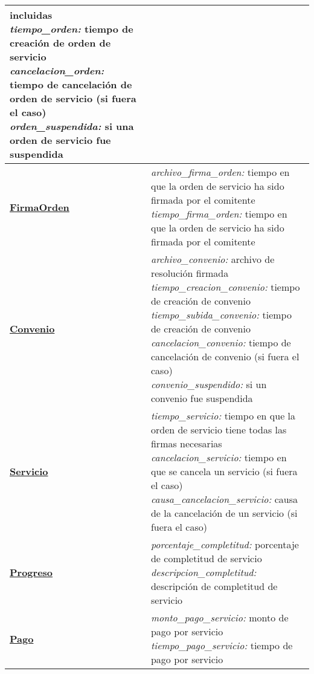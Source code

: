 \begin{center}
\begin{longtable}{ | p{6cm} | p{9.5cm} | }
{		incluidas \\
		\textit{tiempo\_orden:}
		tiempo de creaci\'on de orden de
		servicio \\
		\textit{cancelacion\_orden:}
		tiempo de cancelaci\'on de orden de
		servicio (si fuera el caso) \\
		\textit{orden\_suspendida:}
		si una orden de servicio fue suspendida \\
	} \\
	\hline
	\hyperlink{firmaorden}{\textbf{FirmaOrden}} &
	\parbox[t]{9.5cm}{
		\textit{archivo\_firma\_orden:}
		tiempo en que la orden de servicio
		ha sido firmada por el comitente \\
		\textit{tiempo\_firma\_orden:}
		tiempo en que la orden de servicio
		ha sido firmada por el comitente \\
	} \\
	\hline
	\hyperlink{convenio}{\textbf{Convenio}} &
	\parbox[t]{9.5cm}{
		\textit{archivo\_convenio:}
		archivo de resoluci\'on firmada \\
		\textit{tiempo\_creacion\_convenio:}
		tiempo de creaci\'on de convenio \\
		\textit{tiempo\_subida\_convenio:}
		tiempo de creaci\'on de convenio \\
		\textit{cancelacion\_convenio:}
		tiempo de cancelaci\'on de convenio
		(si fuera el caso) \\
		\textit{convenio\_suspendido:}
		si un convenio fue suspendida \\
	} \\
	\hline
	\hyperlink{servicio}{\textbf{Servicio}} &
	\parbox[t]{9.5cm}{
		\textit{tiempo\_servicio:}
		tiempo en que la orden de servicio
		tiene todas las firmas necesarias \\
		\textit{cancelacion\_servicio:}
		tiempo en que se cancela un servicio
		(si fuera el caso) \\
		\textit{causa\_cancelacion\_servicio:}
		causa de la cancelaci\'on de un
		servicio (si fuera el caso) \\
	} \\
	\hline
	\hyperlink{progreso}{\textbf{Progreso}} &
	\parbox[t]{9.5cm}{
		\textit{porcentaje\_completitud:}
		porcentaje de completitud de
		servicio \\
		\textit{descripcion\_completitud:}
		descripci\'on de completitud de
		servicio \\
	} \\
	\hline
	\hyperlink{pago}{\textbf{Pago}} &
	\parbox[t]{9.5cm}{
		\textit{monto\_pago\_servicio:}
		monto de pago por servicio \\
		\textit{tiempo\_pago\_servicio:}
		tiempo de pago por servicio \\
	} \\
	\hline
\end{longtable}
\end{center}
